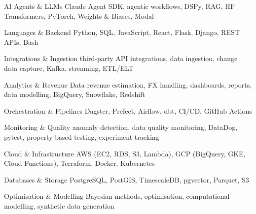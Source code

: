 
\begin{cvskills}

  \cvskill
    {AI Agents \& LLMs}
    {Claude Agent SDK, agentic workflows, DSPy, RAG, HF Transformers, PyTorch, Weights \& Biases, Modal}

  \cvskill
    {Languages \& Backend}
    {Python, SQL, JavaScript, React, Flask, Django, REST APIs, Bash}

  \cvskill
    {Integrations \& Ingestion}
    {third-party API integrations, data ingestion, change data capture, Kafka, streaming, ETL/ELT}

  \cvskill
    {Analytics \& Revenue Data}
    {revenue estimation, FX handling, dashboards, reports, data modelling, BigQuery, Snowflake, Redshift}

  \cvskill
    {Orchestration \& Pipelines}
    {Dagster, Prefect, Airflow, dbt, CI/CD, GitHub Actions}

  \cvskill
    {Monitoring \& Quality}
    {anomaly detection, data quality monitoring, DataDog, pytest, property-based testing, experiment tracking}

  \cvskill
    {Cloud \& Infrastructure}
    {AWS (EC2, RDS, S3, Lambda), GCP (BigQuery, GKE, Cloud Functions), Terraform, Docker, Kubernetes}

  \cvskill
    {Databases \& Storage}
    {PostgreSQL, PostGIS, TimescaleDB, pgvector, Parquet, S3}

  \cvskill
    {Optimisation \& Modelling}
    {Bayesian methods, optimisation, computational modelling, synthetic data generation}

\end{cvskills}
